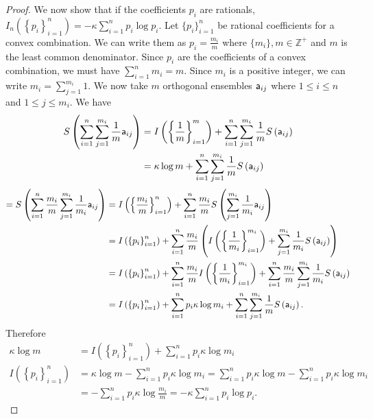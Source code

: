 \begin{mathSection}
\begin{proof}
	We now show that if the coefficients $p_i$ are rationals, $I_n\left(\left\{ p_i\right\}_{i=1}^{n}\right) = - \kappa \sum_{i=1}^{n} p_i \log p_i$. Let $\{p_i\}_{i=1}^{n}$ be rational coefficients for a convex combination. We can write them as $p_i = \frac{m_i}{m}$ where $\{m_i\}, m \in \mathbb{Z}^+$ and $m$ is the least common denominator. Since $p_i$ are the coefficients of a convex combination, we must have $\sum_{i=1}^{n} m_i = m$. Since $m_i$ is a positive integer, we can write $m_i = \sum_{j=1}^{m_i} 1$. We now take $m$ orthogonal ensembles $\ens[a]_{ij}$ where $1 \leq i \leq n$ and $1 \leq j \leq m_i$. We have
	\begin{equation}
		\begin{aligned}
			S\left(\sum_{i=1}^{n}\sum_{j=1}^{m_i} \frac{1}{m} \ens[a]_{ij}\right) &= I\left(\left\{ \frac{1}{m}\right\}_{i=1}^{m}\right) + \sum_{i=1}^{n}\sum_{j=1}^{m_i} \frac{1}{m} S\left(\ens[a]_{ij}\right) \\
			&= \kappa \log m + \sum_{i=1}^{n}\sum_{j=1}^{m_i} \frac{1}{m} S\left(\ens[a]_{ij}\right) \\
		\end{aligned}
	\end{equation}
	\begin{equation}
		\begin{aligned}
			= S\left(\sum_{i=1}^{n} \frac{m_i}{m} \sum_{j=1}^{m_i} \frac{1}{m_i} \ens[a]_{ij}\right)  &=I\left(\left\{ \frac{m_i}{m}\right\}_{i=1}^{n}\right) + \sum_{i=1}^{n} \frac{m_i}{m}  S\left(\sum_{j=1}^{m_i} \frac{1}{m_i} \ens[a]_{ij}\right) \\
			&=I\left(\left\{ p_i\right\}_{i=1}^{n}\right) + \sum_{i=1}^{n} \frac{m_i}{m}\left(I\left(\left\{ \frac{1}{m_i}\right\}_{i=1}^{m_i}\right) + \sum_{j=1}^{m_i} \frac{1}{m_i} S\left(\ens[a]_{ij}\right)\right) \\
			&=I\left(\left\{ p_i\right\}_{i=1}^{n}\right) + \sum_{i=1}^{n} \frac{m_i}{m} I\left(\left\{ \frac{1}{m_i}\right\}_{i=1}^{m_i}\right) + \sum_{i=1}^{n} \frac{m_i}{m} \sum_{j=1}^{m_i} \frac{1}{m_i}S\left(\ens[a]_{ij}\right) \\
			&=I\left(\left\{ p_i\right\}_{i=1}^{n}\right) + \sum_{i=1}^{n} p_i \kappa \log m_i + \sum_{i=1}^{n}  \sum_{j=1}^{m_i} \frac{1}{m} S\left(\ens[a]_{ij}\right).
		\end{aligned}
	\end{equation}
	Therefore
	\begin{equation}
		\begin{aligned}
			\kappa \log m &= I\left(\left\{ p_i\right\}_{i=1}^{n}\right) + \sum_{i=1}^{n} p_i \kappa \log m_i \\
			I\left(\left\{ p_i\right\}_{i=1}^{n}\right) &= \kappa \log m - \sum_{i=1}^{n} p_i \kappa \log m_i = \sum_{i=1}^{n} p_i \kappa \log m - \sum_{i=1}^{n} p_i \kappa \log m_i \\
			&= - \sum_{i=1}^{n} p_i \kappa \log \frac{m_i}{m} = - \kappa \sum_{i=1}^{n} p_i \log p_i.
		\end{aligned}
	\end{equation}
	

\end{proof}
\end{mathSection}
